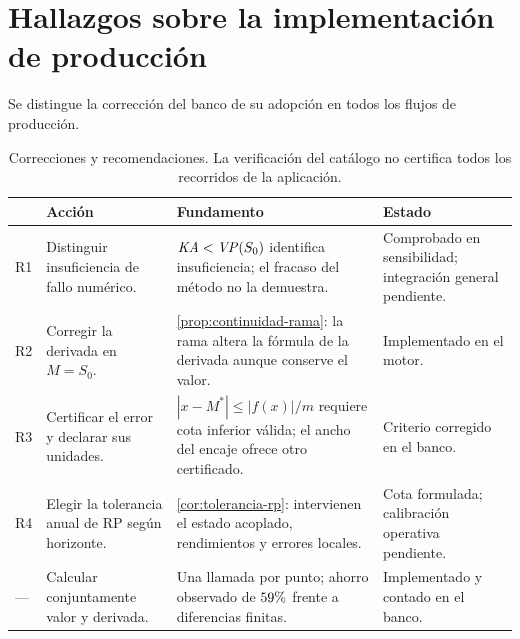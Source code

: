 \section{Hallazgos sobre la implementación de producción}
\label{sec:hallazgos-codigo}
Se distingue la corrección del banco de su adopción en todos los flujos de producción.
\begin{table}[H]
\centering
\caption[Recomendaciones sobre la implementación]{Correcciones y recomendaciones.
La verificación del catálogo no certifica todos los recorridos de la aplicación.}
\label{tab:hallazgos}
\small
\begin{tabular}{@{}>{\raggedright\arraybackslash}p{.55cm}>{\raggedright\arraybackslash}p{4.1cm}>{\raggedright\arraybackslash}p{5.2cm}>{\raggedright\arraybackslash}p{3.1cm}@{}}
\toprule
& \textbf{Acción} & \textbf{Fundamento} & \textbf{Estado} \\
\midrule
R1 & Distinguir insuficiencia de fallo numérico. & $\mathit{KA}<\mathit{VP}(S_0)$ identifica
insuficiencia; el fracaso del método no la demuestra. & Comprobado en sensibilidad;
integración general pendiente. \\
\midrule
R2 & Corregir la derivada en $M=S_0$. & \cref{prop:continuidad-rama}: la rama
altera la fórmula de la derivada aunque conserve el valor. & Implementado en el motor. \\
\midrule
R3 & Certificar el error y declarar sus unidades. & $|x-M^*|\le |f(x)|/m$
requiere cota inferior válida; el ancho del encaje ofrece otro certificado. &
Criterio corregido en el banco. \\
\midrule
R4 & Elegir la tolerancia anual de RP según horizonte. & \cref{cor:tolerancia-rp}:
intervienen el estado acoplado, rendimientos y errores locales. & Cota formulada;
calibración operativa pendiente. \\
\midrule
--- & Calcular conjuntamente valor y derivada. & Una llamada por punto;
ahorro observado de $59\%$ frente a diferencias finitas. &
Implementado y contado en el banco. \\
\bottomrule
\end{tabular}
\end{table}

